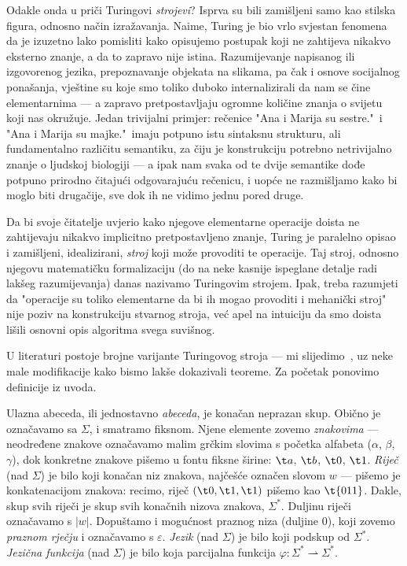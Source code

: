 Odakle onda u priči Turingovi \emph{strojevi}? Isprva su bili zamišljeni samo kao stilska figura, odnosno način izražavanja. Naime, Turing je bio vrlo svjestan fenomena da je izuzetno lako pomisliti kako opisujemo postupak koji ne zahtijeva nikakvo eksterno znanje, a da to zapravo nije istina. Razumijevanje napisanog ili izgovorenog jezika, prepoznavanje objekata na slikama, pa čak i osnove socijalnog ponašanja, vještine su koje smo toliko duboko internalizirali da nam se čine elementarnima --- a zapravo pretpostavljaju ogromne količine znanja o svijetu koji nas okružuje. Jedan trivijalni primjer: rečenice "Ana i Marija su sestre."\ i "Ana i Marija su majke."\ imaju potpuno istu sintaksnu strukturu, ali fundamentalno različitu semantiku, za čiju je konstrukciju potrebno netrivijalno znanje o ljudskoj biologiji --- a ipak nam svaka od te dvije semantike dođe potpuno prirodno čitajući odgovarajuću rečenicu, i uopće ne razmišljamo kako bi moglo biti drugačije, sve dok ih ne vidimo jednu pored druge.

Da bi svoje čitatelje uvjerio kako njegove elementarne operacije doista ne zahtijevaju nikakvo implicitno pretpostavljeno znanje, Turing je paralelno opisao i zamišljeni, idealizirani, \emph{stroj} koji može provoditi te operacije. Taj stroj, odnosno njegovu matematičku formalizaciju (do na neke kasnije ispeglane detalje radi lakšeg razumijevanja) danas nazivamo Turingovim strojem. Ipak, treba razumjeti da "operacije su toliko elementarne da bi ih mogao provoditi i mehanički stroj" nije poziv na konstrukciju stvarnog stroja, već apel na intuiciju da smo doista lišili osnovni opis algoritma svega suvišnog.

U literaturi postoje brojne varijante Turingovog stroja --- mi slijedimo~\cite{sipser}, uz neke male modifikacije kako bismo lakše dokazivali teoreme. Za početak ponovimo definicije iz uvoda.

Ulazna abeceda, ili jednostavno \emph{abeceda}, je konačan neprazan skup. Obično je označavamo sa $\Sigma$, i smatramo fiksnom. Njene elemente zovemo \emph{znakovima} --- ne\-od\-re\-đe\-ne znakove označavamo malim grčkim slovima s početka alfabeta ($\alpha$, $\beta$, $\gamma$), dok konkretne znakove pišemo u fontu fiksne širine: $\t a$, $\t b$, $\t 0$, $\t 1$. \emph{Riječ} (nad $\Sigma$) je bilo koji konačan niz znakova, najčešće označen slovom $w$ --- pišemo je konkatenacijom znakova: recimo, riječ $(\t0,\t1,\t1)$ pišemo kao $\t{011}$. Dakle, skup svih riječi je skup svih konačnih nizova znakova, $\Sigma^*$. Duljinu riječi označavamo s $\left|w\right|$. Dopuštamo i mogućnost praznog niza (duljine $0$), koji zovemo \emph{praznom rječju} i označavamo s $\varepsilon$. \emph{Jezik} (nad $\Sigma$) je bilo koji podskup od $\Sigma^*$. \emph{Jezična funkcija} (nad $\Sigma$) je bilo koja parcijalna funkcija $\varphi\colon\Sigma^*\rightharpoonup\Sigma^*$.

